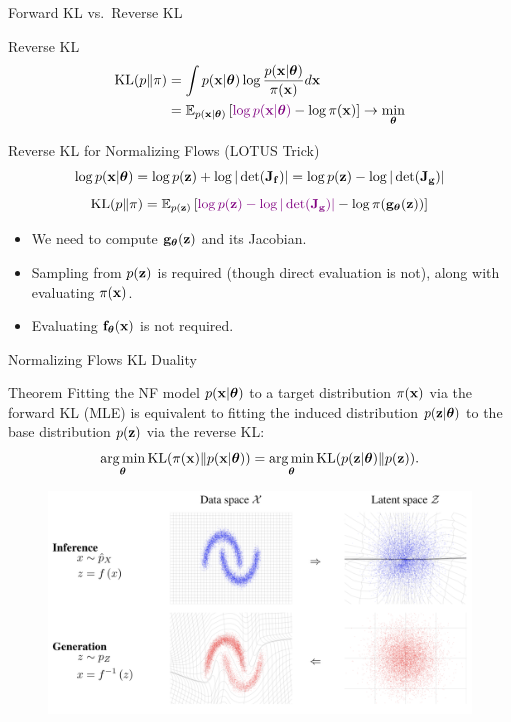 \documentclass{beamer}
\begin{document}
\begin{frame}{Forward KL vs.\ Reverse KL}
	\begin{block}{Reverse KL}
	  	\vspace{-0.5cm}
			\begin{align*}
				\mathrm{KL}(p \| \pi) &= \int p(\mathbf{x} | \boldsymbol{\theta}) \log \frac{p(\mathbf{x} | \boldsymbol{\theta})}{\pi(\mathbf{x})} d \mathbf{x} \\
				&= \mathbb{E}_{p(\mathbf{x} | \boldsymbol{\theta})} \left[{\color{violet}\log p(\mathbf{x} | \boldsymbol{\theta})} - \log \pi(\mathbf{x})\right] \rightarrow \min_{\boldsymbol{\theta}}
			\end{align*}
		\vspace{-0.7cm}
	\end{block}
	\begin{block}{Reverse KL for Normalizing Flows (LOTUS Trick)}
  		\vspace{-0.3cm}
		\[
			 \log p(\mathbf{x} | \boldsymbol{\theta}) = \log p(\mathbf{z}) +  \log  |\det (\mathbf{J}_{\mathbf{f}})| = \log p(\mathbf{z}) - \log |\det (\mathbf{J}_{\mathbf{g}})| 
		\]
		\[
			\mathrm{KL}(p \| \pi)  = \mathbb{E}_{p(\mathbf{z})} \left[ {\color{violet} \log p(\mathbf{z}) -  \log |\det (\mathbf{J}_{\mathbf{g}})| } - \log \pi(\mathbf{g}_{\boldsymbol{\theta}}(\mathbf{z})) \right]
		\]
		\vspace{-0.3cm}
		\begin{itemize}
		\item We need to compute $\mathbf{g}_{\boldsymbol{\theta}}(\mathbf{z})$ and its Jacobian.
		\item Sampling from $p(\mathbf{z})$ is required (though direct evaluation is not), along with evaluating $\pi(\mathbf{x})$.
		\item Evaluating $\mathbf{f}_{\boldsymbol{\theta}}(\mathbf{x})$ is not required.
		\end{itemize}
	\end{block}
\end{frame}
\begin{frame}{Normalizing Flows KL Duality}
	\begin{block}{Theorem}
		Fitting the NF model $p(\mathbf{x}| \boldsymbol{\theta})$ to a target distribution $\pi(\mathbf{x})$ via the forward KL (MLE) is equivalent to fitting the induced distribution $p(\mathbf{z}| \boldsymbol{\theta})$ to the base distribution $p(\mathbf{z})$ via the reverse KL:
		\vspace{-0.2cm}
		\[
			\operatorname*{arg\,min}_{\boldsymbol{\theta}} \mathrm{KL}(\pi(\mathbf{x}) \| p(\mathbf{x} | \boldsymbol{\theta})) = \operatorname*{arg\,min}_{\boldsymbol{\theta}} \mathrm{KL}(p(\mathbf{z} | \boldsymbol{\theta}) \| p(\mathbf{z})).
		\]
		\vspace{-0.7cm}
	\end{block}
	\begin{figure}
		\includegraphics[width=0.85\linewidth]{figs/flows_how2}
	\end{figure}
\end{frame}
\end{document}
